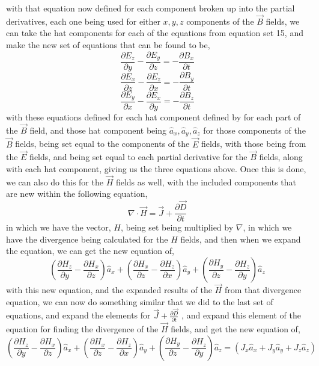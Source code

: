 \documentclass[]{article}
\begin{document}
with that equation now defined for each component broken up into the partial derivatives, each one being used for either $x,y,z$ components of the $\vec{B}$ fields, we can take the hat components for each of the equations from equation set 15, and make the new set of equations that can be found to be,
\[\frac{\partial{E}_z}{\partial{y}} - \frac{\partial{E}_y}{\partial{z}} = -\frac{\partial{B}_x}{\partial{t}}\]
\[\frac{\partial{E}_x}{\partial{z}} - \frac{\partial{E}_z}{\partial{x}} = -\frac{\partial{B}_y}{\partial{t}}\]
\[\frac{\partial{E}_y}{\partial{x}} - \frac{\partial{E}_x}{\partial{y}} = -\frac{\partial{B}_z}{\partial{t}}\]
with these equations defined for each hat component defined by for each part of the $\vec{B}$ field, and those hat component being $\hat{a}_x, \hat{a}_y, \hat{a}_z$ for those components of the $\vec{B}$ fields, being set equal to the components of the $\vec{E}$ fields, with those being from the $\vec{E}$ fields, and being set equal to each partial derivative for the $\vec{B}$ fields, along with each hat component, giving us the three equations above. Once this is done, we can also do this for the $\vec{H}$ fields as well, with the included components that are new within the following equation,
\[\nabla \cdot \vec{H} = \vec{J} + \frac{\partial{\vec{D}}}{\partial{t}}\]
in which we have the vector, $H$, being set being multiplied by $\nabla$, in which we have the divergence being calculated for the $H$ fields, and then when we expand the equation, we can get the new equation of,
\linebreak
\begin{equation}
(\frac{\partial{H}_z}{\partial{y}} - \frac{\partial{H}_x}{\partial{z}})\hat{a}_x + (\frac{\partial{H}_x}{\partial{z}} - \frac{\partial{H}_z}{\partial{x}})\hat{a}_y + (\frac{\partial{H}_y}{\partial{z}} - \frac{\partial{H}_z}{\partial{y}})\hat{a}_z
\end{equation}
with this new equation, and the expanded results of the $\vec{H}$ from that divergence equation, we can now do something similar that we did to the last set of equations, and expand the elements for $\vec{J} + \frac{\partial{\vec{D}}}{\partial{t}}$ , and expand this element of the equation for finding the divergence of the $\vec{H}$ fields, and get the new equation of,
\begin{equation}
(\frac{\partial{H}_z}{\partial{y}} - \frac{\partial{H}_x}{\partial{z}})\hat{a}_x + (\frac{\partial{H}_x}{\partial{z}} - \frac{\partial{H}_z}{\partial{x}})\hat{a}_y + (\frac{\partial{H}_y}{\partial{z}} - \frac{\partial{H}_z}{\partial{y}})\hat{a}_z = (J_x\hat{a}_x + J_y\hat{a}_y + J_z\hat{a}_z)
\end{equation}
\end{document}
